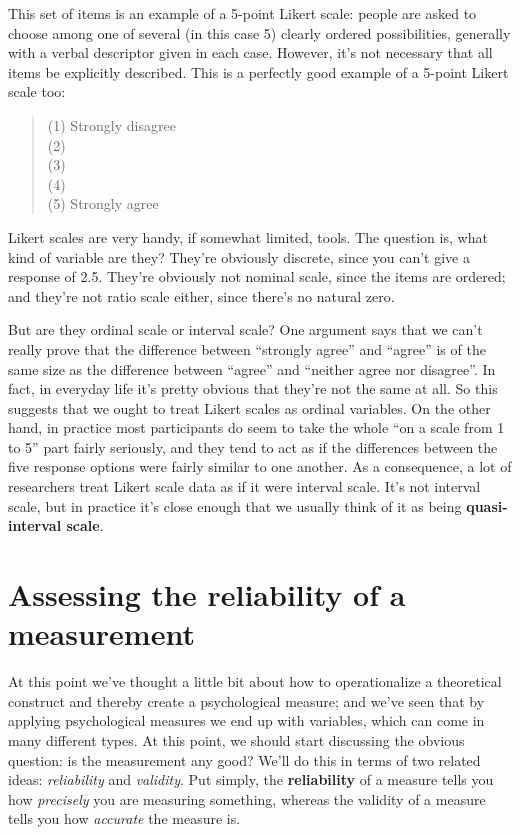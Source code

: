 \documentclass[
]{book}
\begin{document}
This set of items is an example of a 5-point Likert scale: people are asked to choose among one of several (in this case 5) clearly ordered possibilities, generally with a verbal descriptor given in each case. However, it's not necessary that all items be explicitly described. This is a perfectly good example of a 5-point Likert scale too:

\begin{quote}
(1) Strongly disagree\\
(2)\\
(3)\\
(4)\\
(5) Strongly agree
\end{quote}

Likert scales are very handy, if somewhat limited, tools. The question is, what kind of variable are they? They're obviously discrete, since you can't give a response of 2.5. They're obviously not nominal scale, since the items are ordered; and they're not ratio scale either, since there's no natural zero.

But are they ordinal scale or interval scale? One argument says that we can't really prove that the difference between ``strongly agree'' and ``agree'' is of the same size as the difference between ``agree'' and ``neither agree nor disagree''. In fact, in everyday life it's pretty obvious that they're not the same at all. So this suggests that we ought to treat Likert scales as ordinal variables. On the other hand, in practice most participants do seem to take the whole ``on a scale from 1 to 5'' part fairly seriously, and they tend to act as if the differences between the five response options were fairly similar to one another. As a consequence, a lot of researchers treat Likert scale data as if it were interval scale. It's not interval scale, but in practice it's close enough that we usually think of it as being \textbf{quasi-interval scale}.

\section{Assessing the reliability of a measurement}\label{assessing-the-reliability-of-a-measurement}

At this point we've thought a little bit about how to operationalize a theoretical construct and thereby create a psychological measure; and we've seen that by applying psychological measures we end up with variables, which can come in many different types. At this point, we should start discussing the obvious question: is the measurement any good? We'll do this in terms of two related ideas: {\emph{reliability}} and {\emph{validity}}. Put simply, the \textbf{reliability} of a measure tells you how {\emph{precisely}} you are measuring something, whereas the validity of a measure tells you how {\emph{accurate}} the measure is.
\end{document}
